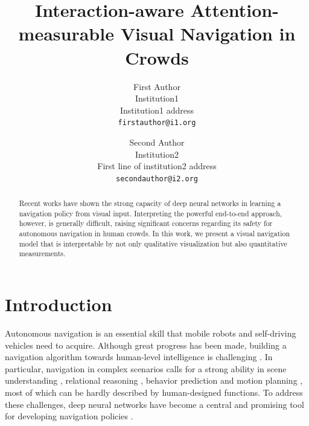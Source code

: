 \documentclass[10pt,twocolumn,letterpaper]{article}
\begin{document}
\title{Interaction-aware Attention-measurable Visual Navigation in Crowds}

\author{First Author\\
Institution1\\
Institution1 address\\
{\tt\small firstauthor@i1.org}
\and
Second Author\\
Institution2\\
First line of institution2 address\\
{\tt\small secondauthor@i2.org}
}

\maketitle

\begin{abstract}
   Recent works have shown the strong capacity of deep neural networks in learning a navigation policy from visual input. Interpreting the powerful end-to-end approach, however, is generally difficult, raising significant concerns regarding its safety for autonomous navigation in human crowds. In this work, we present a visual navigation model that is interpretable by not only qualitative visualization but also quantitative measurements. 


   \vspace{3cm}
\end{abstract}




\section{Introduction}

Autonomous navigation is an essential skill that mobile robots and self-driving vehicles need to acquire. Although great progress has been made, building a navigation algorithm towards human-level intelligence is challenging \cite{urmson_autonomous_2009, levinson_towards_2011, sunderhauf_limits_2018}. In particular, navigation in complex scenarios calls for a strong ability in scene understanding \cite{li_towards_2009, cordts_cityscapes_2016}, relational reasoning \cite{santoro_simple_2017}, behavior prediction \cite{alahi_social_2016} and motion planning \cite{latombe_robot_2012}, most of which can be hardly described by human-designed functions. To address these challenges, deep neural networks have become a central and promising tool for developing navigation policies \cite{muller_off-road_2006,bojarski_end_2016, shalev-shwartz_safe_2016}. 
\end{document}
